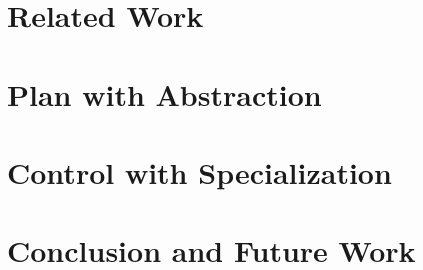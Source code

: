 \documentclass[12pt]{cmuthesis}
\theoremstyle{plain}
\begin{document}
\chapter{Related Work} \label{chap:related_work}


\chapter{Plan with Abstraction} \label{chap:abstraction}


\chapter{Control with Specialization} \label{chap:special}


\chapter{Conclusion and Future Work}

%

\backmatter


\renewcommand{\bibsection}{\chapter{\bibname}}

\end{document}
